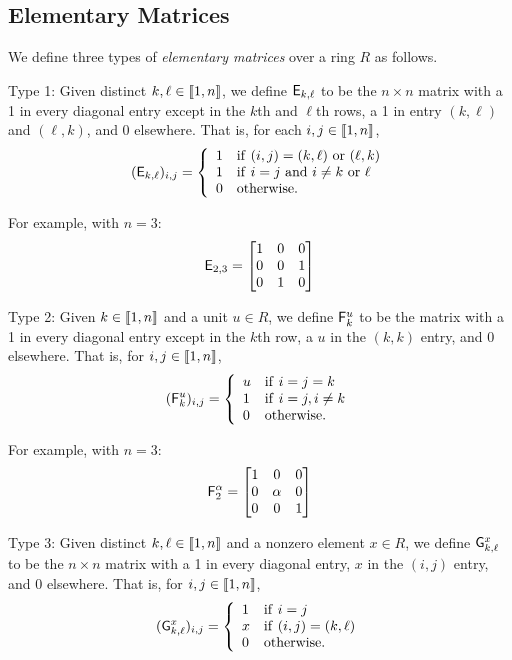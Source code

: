\documentclass{memoir}
\begin{document}
\subsection{Elementary Matrices}
\setcounter{section}{9}
\setcounter{dfn}{5}

\begin{dfn}
We define three types of \emph{elementary matrices} over a ring $R$ as follows.
\begin{enumerate*}
\item[] Type 1: Given distinct $k,\ell \in \llbracket 1, n \rrbracket$, we define $\mathsf{E}_{{k},{\ell}}$ to be the $n \times n$ matrix with a 1 in every diagonal entry except in the $k$th and $\ell$th rows, a 1 in entry $(k,\ell)$ and $(\ell,k)$, and 0 elsewhere. That is, for each $i,j \in \llbracket 1, n \rrbracket$, \[(\EMSwap{k}{\ell})_{i,j} = \left\{ \begin{array}{ll} 1 & \mathrm{if}\ (i,j) = (k,\ell)\ \mathrm{or}\ (\ell,k) \\ 1 & \mathrm{if}\ i=j\ \mathrm{and}\ i \neq k\ \mathrm{or}\ \ell \\ 0 & \mathrm{otherwise.} \end{array}\right. \]

For example, with $n = 3$: \[ \mathsf{E}_{{2},{3}} = \begin{bmatrix} 1 & 0 & 0 \\ 0 & 0 & 1 \\ 0 & 1 & 0 \end{bmatrix} \]

\item[] Type 2: Given $k \in \llbracket 1, n \rrbracket$ and a unit $u \in R$, we define $\mathsf{F}_{k}^{u}$ to be the matrix with a 1 in every diagonal entry except in the $k$th row, a $u$ in the $(k,k)$ entry, and 0 elsewhere. That is, for $i,j \in \llbracket 1, n \rrbracket$, \[(\mathsf{F}_{k}^{u})_{i,j} = \left\{\begin{array}{ll} u & \mathrm{if}\ i=j=k \\ 1 & \mathrm{if}\ i=j, i \neq k \\ 0 & \mathrm{otherwise.} \end{array}\right.\]

For example, with $n = 3$: \[ \mathsf{F}_{2}^{\alpha} = \begin{bmatrix} 1 & 0 & 0 \\ 0 & \alpha & 0 \\ 0 & 0 & 1 \end{bmatrix} \]

\item[] Type 3: Given distinct $k,\ell \in \llbracket 1, n \rrbracket$ and a nonzero element $x \in R$, we define $\mathsf{G}_{{k},{\ell}}^{x}$ to be the $n \times n$ matrix with a 1 in every diagonal entry, $x$ in the $(i,j)$ entry, and 0 elsewhere. That is, for $i,j \in \llbracket 1, n \rrbracket$, \[(\EMAdd{k}{\ell}{x})_{i,j} = \left\{ \begin{array}{ll} 1 & \mathrm{if}\ i = j \\ x & \mathrm{if}\ (i,j) = (k,\ell) \\ 0 & \mathrm{otherwise.} \end{array}\right.\]


\end{enumerate*}
\end{dfn}
\end{document}
